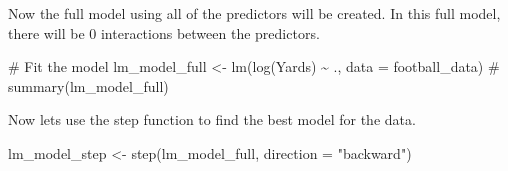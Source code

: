 \documentclass[
  super,
  preprint,
  3p]{elsarticle}
\newenvironment{Shaded}{\begin{snugshade}}{\end{snugshade}}
\newcommand{\AttributeTok}[1]{\textcolor[rgb]{0.40,0.45,0.13}{#1}}
\newcommand{\CommentTok}[1]{\textcolor[rgb]{0.37,0.37,0.37}{#1}}
\newcommand{\FunctionTok}[1]{\textcolor[rgb]{0.28,0.35,0.67}{#1}}
\newcommand{\NormalTok}[1]{\textcolor[rgb]{0.00,0.23,0.31}{#1}}
\newcommand{\OtherTok}[1]{\textcolor[rgb]{0.00,0.23,0.31}{#1}}
\newcommand{\SpecialCharTok}[1]{\textcolor[rgb]{0.37,0.37,0.37}{#1}}
\newcommand{\StringTok}[1]{\textcolor[rgb]{0.13,0.47,0.30}{#1}}
\begin{document}
Now the full model using all of the predictors will be created. In this
full model, there will be 0 interactions between the predictors.

\begin{Shaded}
\begin{Highlighting}[]
\CommentTok{\# Fit the model}
\NormalTok{lm\_model\_full }\OtherTok{\textless{}{-}} \FunctionTok{lm}\NormalTok{(}\FunctionTok{log}\NormalTok{(Yards) }\SpecialCharTok{\textasciitilde{}}\NormalTok{ ., }\AttributeTok{data =}\NormalTok{ football\_data)}
\CommentTok{\# summary(lm\_model\_full)}
\end{Highlighting}
\end{Shaded}

Now lets use the step function to find the best model for the data.

\begin{Shaded}
\begin{Highlighting}[]
\NormalTok{lm\_model\_step }\OtherTok{\textless{}{-}} \FunctionTok{step}\NormalTok{(lm\_model\_full, }\AttributeTok{direction =} \StringTok{"backward"}\NormalTok{)}
\end{Highlighting}
\end{Shaded}
\end{document}
